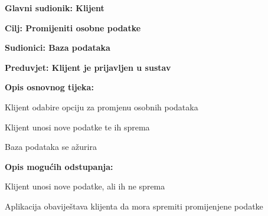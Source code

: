 					\noindent {}
					\begin{packed_item}
							
						\item \textbf{Glavni sudionik: Klijent}
						\item  \textbf{Cilj: Promijeniti osobne podatke} 
						\item  \textbf{Sudionici: Baza podataka}
						\item  \textbf{Preduvjet: Klijent je prijavljen u sustav}
						\item  \textbf{Opis osnovnog tijeka: }
							
						\item[] \begin{packed_enum}
								
							\item Klijent odabire opciju za promjenu osobnih podataka
							\item Klijent unosi nove podatke te ih sprema
							\item Baza podataka se ažurira
						\end{packed_enum}
							
						\item  \textbf{Opis mogućih odstupanja:}
							
						\item[] \begin{packed_item}
								
							\item[2.a] Klijent unosi nove podatke, ali ih ne sprema
							\item[] \begin{packed_enum}
									
								\item Aplikacija obaviještava klijenta da mora spremiti promijenjene podatke
									
							\end{packed_enum}
								
						\end{packed_item}
							
					\end{packed_item}
					
